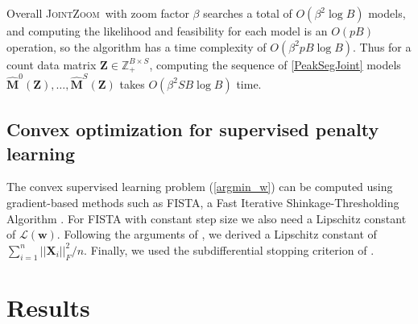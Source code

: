 \documentclass{article} %
\newcommand{\ZZ}{\mathbb Z}
\newcommand{\JointHeuristic}{\textsc{JointZoom}}
\begin{document}
Overall \JointHeuristic\ with zoom factor $\beta$ searches a total of
$O(\beta^2\log B)$ models, and computing the likelihood and
feasibility for each model is an $O(pB)$ operation, so the algorithm
has a time complexity of $O(\beta^2 pB\log B)$. Thus for a count data
matrix $\mathbf Z\in\ZZ_+^{B\times S}$, computing the sequence of
\ref{PeakSegJoint} models $\mathbf{\hat M}^0(\mathbf Z), \dots,
\mathbf{\hat M}^S(\mathbf Z)$ takes $O(\beta^2 S B\log B)$ time.

\subsection{Convex optimization for supervised penalty learning}


The convex supervised learning problem (\ref{argmin_w}) can be
computed using gradient-based methods such as FISTA, a Fast Iterative
Shinkage-Thresholding Algorithm \citep{fista}. 
For FISTA with constant step size we also need a Lipschitz constant of
$\mathcal L(\mathbf w)$. Following the arguments of
\citet{hingeSquareFISTA}, we derived a Lipschitz constant of
$\sum_{i=1}^n ||\mathbf X_i||_F^2/n$. Finally, we used the
subdifferential stopping criterion of \citet{HOCKING-penalties}.


\section{Results}
\label{sec:results}
\end{document}

